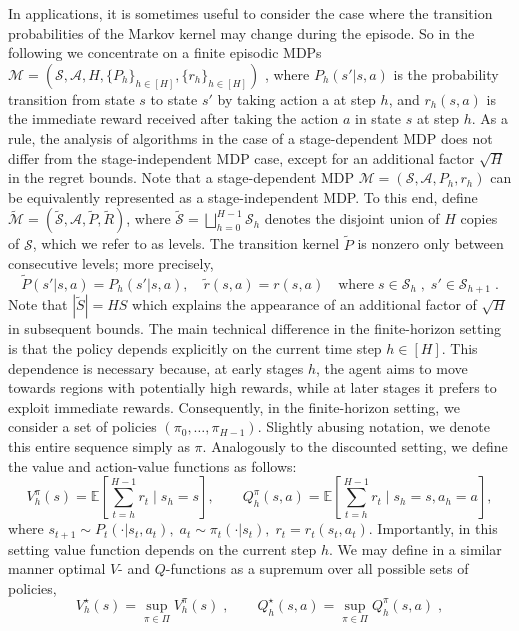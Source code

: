 \documentclass{article}
\numberwithin{equation}{section}
\newcommand{\E}{\mathbb E}
\newcommand{\cA}{\mathcal{A}}
\newcommand{\cM}{\mathcal{M}}
\newcommand{\cS}{\mathcal{S}}
\newcommand{\eqsp}{\;}
\begin{document}
In applications, it is sometimes useful to consider the case where the transition probabilities of the Markov kernel may change during the episode. So in the following we concentrate on a finite episodic MDPs
\(\cM = (\cS, \cA, H, \{P_h\}_{h\in[H]}, \{r_h\}_{h\in[H]}) \)
, where \(P_h(s'
|s, a)\) is the probability
transition from state \(s\) to state \(s'\) by taking action a at step \(h\), and \(r_h(s, a)\) is the immediate reward received after taking the action \(a\) in state \(s\) at step \(h.\) As a rule, the analysis of algorithms in the case of a stage-dependent MDP does not differ from the stage-independent MDP case, except for an additional factor \( \sqrt{H} \) in the regret bounds. Note that a stage-dependent MDP \(\cM= (\cS, \cA, P_h, r_h)\) can be equivalently represented as a stage-independent MDP. To this end, define \(\widetilde{\cM} = (\widetilde{\cS},\cA, \widetilde{P}, \widetilde{R} )\), where \(\widetilde{\cS} = \bigsqcup_{h=0}^{H-1} \cS_h\) denotes the disjoint union of \(H\) copies of \(\cS\), which we refer to as levels. The transition kernel \(\widetilde{P}\) is nonzero only between consecutive levels; more precisely, 
\[\widetilde{P}(s'|s, a) = P_h(s'|s,a), \quad \tilde{r}(s,a) = r(s,a)\quad \text{where}\eqsp s\in\cS_h\eqsp,\eqsp s'\in\cS_{h+1}\eqsp.\]
Note that \(|\widetilde{S}| = HS\) which explains the appearance of an additional factor of \(\sqrt{H}\) in subsequent bounds. The main technical difference in the finite-horizon setting is that the policy depends explicitly on the current time step \(h\in[H]\). This dependence is necessary because, at early stages \(h\), the agent aims to move towards regions with potentially high rewards, while at later stages it prefers to exploit immediate rewards. Consequently, in the finite-horizon setting, we consider a set of policies \((\pi_0, \ldots, \pi_{H-1})\). Slightly abusing notation, we denote this entire sequence simply as \(\pi\). Analogously to the discounted setting, we define the value and action-value functions as follows:
\[
    V^\pi_h(s) = \E\left[ \sum_{t=h}^{H-1} r_t \mid s_{h} = s  \right], \qquad Q^\pi_h(s,a) = \E\left[ \sum_{t=h}^{H-1} r_t \mid s_{h} = s, a_h = a  \right], 
\]
where $ s_{t+1} \sim P_t(\cdot|s_t,a_t),\eqsp a_t \sim \pi_t(\cdot | s_t), \eqsp r_t  =r_t(s_t, a_t)$. Importantly, in this setting value function depends on the current step $h$. We may define in a similar manner optimal $V$- and $Q$-functions as a supremum over all possible sets of policies,
\[
    V^\star_h(s) = \sup_{\pi \in \Pi} V^\pi_h(s)\eqsp, \qquad Q^\star_h(s,a) = \sup_{\pi \in \Pi} Q^\pi_h(s,a)\eqsp,
\]
\end{document}
